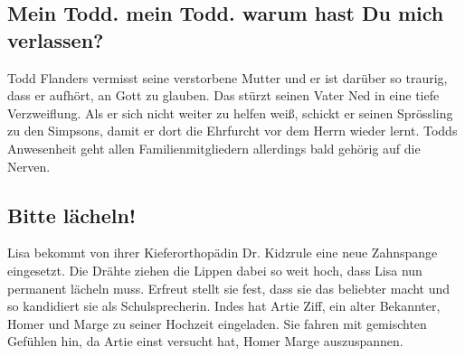 
\subsection{Mein Todd. mein Todd. warum hast Du mich verlassen?}
Todd Flanders vermisst seine verstorbene Mutter und er ist darüber so traurig, dass er aufhört, an Gott zu glauben. Das stürzt seinen Vater Ned in eine tiefe Verzweiflung. Als er sich nicht weiter zu helfen weiß, schickt er seinen Sprössling zu den Simpsons, damit er dort die Ehrfurcht vor dem Herrn wieder lernt. Todds Anwesenheit geht allen Familienmitgliedern allerdings bald gehörig auf die Nerven.


\subsection{Bitte lächeln!}\label{ZABF05}
Lisa bekommt von ihrer Kieferorthopädin Dr. Kidzrule eine neue Zahnspange eingesetzt. Die Drähte ziehen die Lippen dabei so weit hoch, dass Lisa nun permanent lächeln muss. Erfreut stellt sie fest, dass sie das beliebter macht und so kandidiert sie als Schulsprecherin. Indes hat Artie Ziff, ein alter Bekannter, Homer und Marge zu seiner Hochzeit eingeladen. Sie fahren mit gemischten Gefühlen hin, da Artie einst versucht hat, Homer Marge auszuspannen.


